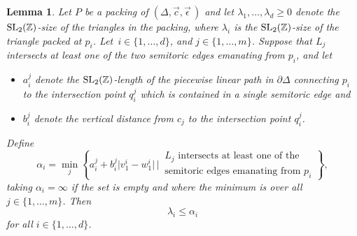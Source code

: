 \documentclass[10pt,a4paper]{amsart}
\numberwithin{equation}{section}
\newtheorem{Lemma}[Theorem]{Lemma}
\def\Z{{\mathbb Z}}
\newcommand{\De}{\Delta}
\newcommand{\SL}{{\rm SL}_2(\Z)}
\newcommand{\strep}{(\De,\vec{c},\vec{\epsilon}\,)}
\theoremstyle{definition}
\theoremstyle{plain}
\theoremstyle{plain}
\begin{document}
\begin{Lemma}\label{lem:avoid-markedpt}
Let $P$ be a packing of $\strep$ and let $\lambda_1,\ldots, \lambda_d\geq 0$ denote the $\SL$-size of the triangles in the packing, where $\lambda_i$ is the $\SL$-size of the triangle packed at $p_i$.
Let~$i\in\{1,\ldots, d\}$, and $j\in\{1,\ldots, m\}$.
Suppose that $L_j$ intersects at least one of the two semitoric edges emanating from $p_i$, and
let
 \begin{itemize}\itemsep=0pt
 \item $a_i^j$ denote the $\SL$-length of the piecewise linear path in $\partial\De$ connecting $p_i$ to the intersection point $q_i^j$ which is contained in a single semitoric edge and
 \item $b_i^j$ denote the vertical distance from $c_j$ to the intersection point $q_i^j$.
 \end{itemize}
 Define
 \begin{equation}\label{eqn:alphai}
 \alpha_i = \min_{j} \left\{a_i^j + b_i^j \big|v^i_1-w^i_1\big| \,\bigg|\, \begin{matrix}L_j \text{ intersects at least one of the}\\ \text{semitoric edges emanating from $p_i$}\end{matrix}\right\},
 \end{equation}
 taking $\alpha_i = \infty$ if the set is empty and where the minimum is over all $j\in\{1,\ldots, m\}$.
 Then
 \[
 \lambda_i \leq \alpha_i
 \]
 for all $i\in \{1,\ldots,d\}$.
\end{Lemma}
\end{document}
